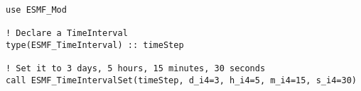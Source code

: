 
\begin{verbatim}
use ESMF_Mod

! Declare a TimeInterval
type(ESMF_TimeInterval) :: timeStep

! Set it to 3 days, 5 hours, 15 minutes, 30 seconds
call ESMF_TimeIntervalSet(timeStep, d_i4=3, h_i4=5, m_i4=15, s_i4=30)

\end{verbatim}
